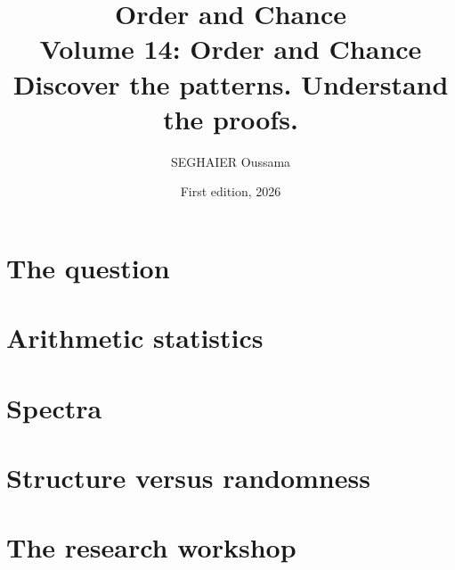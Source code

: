 \documentclass[11pt,openany]{book}
\title{\Huge\textbf{Order and Chance}\\[0.4em]\LARGE Volume 14: Order and Chance\\[0.6em]
\Large Discover the patterns. Understand the proofs.}
\author{SEGHAIER Oussama}
\date{First edition, 2026}
\begin{document}
\frontmatter
\makecover
\maketitle

\tableofcontents

\mainmatter

\part{The question}




\part{Arithmetic statistics}






\part{Spectra}




\part{Structure versus randomness}



\part{The research workshop}













\appendix












\end{document}
